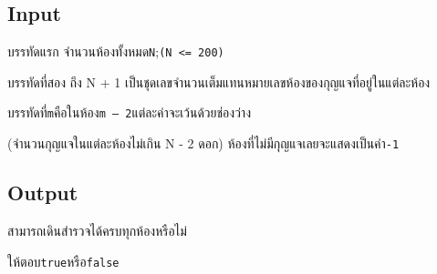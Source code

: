 \documentclass{article}
\begin{document}
\subsection*{Input}
บรรทัดแรก จำนวนห้องทั้งหมด\texttt{N};\texttt{(N\ \textless{}=\ 200)}



บรรทัดที่สอง ถึง N + 1 เป็นชุดเลขจำนวนเต็มแทนหมายเลขห้องของกุญแจที่อยู่ในแต่ละห้อง

บรรทัดที่\texttt{m}คือในห้อง\texttt{m\ –\ 2}แต่ละค่าจะเว้นด้วยช่องว่าง

(จำนวนกุญแจในแต่ละห้องไม่เกิน N - 2 ดอก) ห้องที่ไม่มีกุญแจเลยจะแสดงเป็นค่า\texttt{-1}



\subsection*{Output}
สามารถเดินสำรวจได้ครบทุกห้องหรือไม่

ให้ตอบ\texttt{true}\textbf{}หรือ\textbf{}\texttt{false}\\
\end{document}
